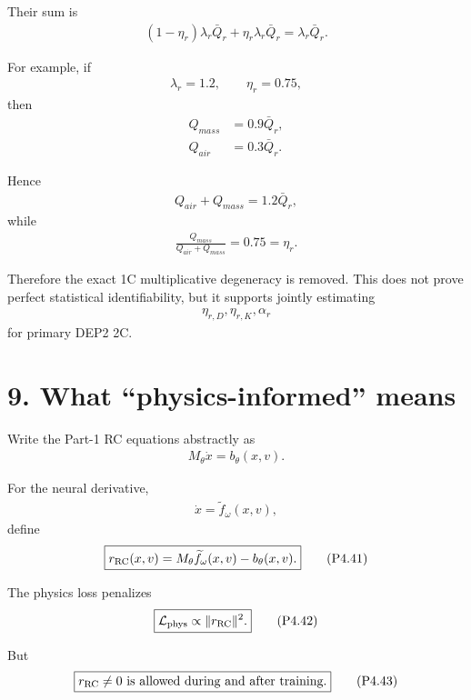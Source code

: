 \documentclass[11pt]{article}
\begin{document}
Their sum is
\begin{align}
\boxed{
(1-\eta_r)\lambda_r\bar Q_r
+
\eta_r\lambda_r\bar Q_r
=
\lambda_r\bar Q_r.
}
\tag{P4.36}
\end{align}

For example, if
\begin{align}
\lambda_r=1.2,
\qquad
\eta_r=0.75,
\end{align}
then
\begin{align}
Q_{mass}&=0.9\bar Q_r,\\
Q_{air}&=0.3\bar Q_r.
\end{align}

Hence
\begin{align}
\boxed{Q_{air}+Q_{mass}=1.2\bar Q_r,}
\tag{P4.37}
\end{align}
while
\begin{align}
\boxed{
\frac{Q_{mass}}{Q_{air}+Q_{mass}}
=
0.75
=
\eta_r.
}
\tag{P4.38}
\end{align}

Therefore the exact 1C multiplicative degeneracy is removed. This does not prove perfect statistical identifiability, but it supports jointly estimating
\begin{align}
\boxed{
\eta_{r,D},\eta_{r,K},\alpha_r
}
\tag{P4.39}
\end{align}
for primary DEP2 2C.

\section*{9. What ``physics-informed'' means}

Write the Part-1 RC equations abstractly as
\begin{align}
\boxed{
M_\theta\dot x=b_\theta(x,v).
}
\tag{P4.40}
\end{align}

For the neural derivative,
\begin{align}
\dot x=\widetilde f_\omega(x,v),
\end{align}
define
\begin{align}
\boxed{
r_{\rm RC}(x,v)
=
M_\theta\widetilde f_\omega(x,v)
-
b_\theta(x,v).
}
\tag{P4.41}
\end{align}

The physics loss penalizes
\begin{align}
\boxed{\mathcal L_{\rm phys}\propto\|r_{\rm RC}\|^2.}
\tag{P4.42}
\end{align}

But
\begin{align}
\boxed{r_{\rm RC}\neq0\text{ is allowed during and after training.}}
\tag{P4.43}
\end{align}
\end{document}
